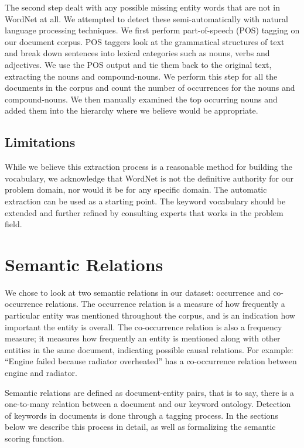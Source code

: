 The second step dealt with any possible missing entity words that are not in
WordNet at all. We attempted to detect these semi-automatically with natural
language processing techniques. We first perform part-of-speech (POS) tagging on our document 
corpus. POS taggers look at the grammatical structures of text and break down 
sentences into lexical categories such as nouns, verbs and adjectives. We use the 
POS output and tie them back to the original text, extracting the nouns and 
compound-nouns. We perform this step for all the documents in the corpus and 
count the number of occurrences for the nouns and compound-nouns. We then manually 
examined the top occurring nouns and added them into the hierarchy where we believe 
would be appropriate.

\subsection{Limitations}
While we believe this extraction process is a reasonable method for building the
vocabulary, we acknowledge that WordNet is not the definitive authority for our 
problem domain, nor would it be for any specific domain. The automatic
extraction can be used as a starting point. The keyword vocabulary should be
extended and further refined by consulting experts that works in the problem field. 



\section{Semantic Relations}
We chose to look at two semantic relations in our dataset: occurrence and
co-occurrence relations. The occurrence relation is a measure of how frequently
a particular entity was mentioned throughout the corpus, and is an
indication how important the entity is overall. The co-occurrence relation is
also a frequency measure; it measures how frequently an entity is mentioned along
with other entities in the same document, indicating possible causal relations.
For example: ``Engine failed because radiator overheated'' has a co-occurrence
relation between engine and radiator.

Semantic relations are defined as document-entity pairs, that is to say, there
is a one-to-many relation between a document and our keyword ontology. Detection of
keywords in documents is done through a tagging process. In the sections below we
describe this process in detail, as well as formalizing the semantic scoring
function.
 

